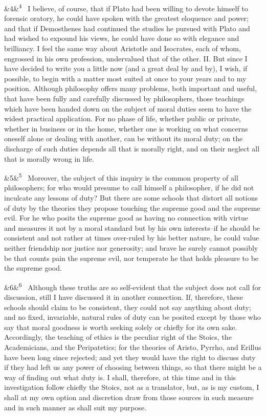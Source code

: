 \documentclass[12pt]{article}
\newcommand{\para}[1][]{\par\noindent\ifx&#1&\else\textsuperscript{\footnotesize #1}~\fi}
\begin{document}
\para[4] I believe, of course, that if Plato had been willing to devote himself to forensic oratory, he could have spoken with the greatest eloquence and power; and that if Demosthenes had continued the studies he pursued with Plato and had wished to expound his views, he could have done so with elegance and brilliancy. I feel the same way about Aristotle and Isocrates, each of whom, engrossed in his own profession, undervalued that of the other. II. But since I have decided to write you a little now (and a great deal by and by), I wish, if possible, to begin with a matter most suited at once to your years and to my position. Although philosophy offers many problems, both important and useful, that have been fully and carefully discussed by philosophers, those teachings which have been handed down on the subject of moral duties seem to have the widest practical application. For no phase of life, whether public or private, whether in business or in the home, whether one is working on what concerns oneself alone or dealing with another, can be without its moral duty; on the discharge of such duties depends all that is morally right, and on their neglect all that is morally wrong in life.

\para[5] Moreover, the subject of this inquiry is the common property of all philosophers; for who would presume to call himself a philosopher, if he did not inculcate any lessons of duty? But there are some schools that distort all notions of duty by the theories they propose touching the supreme good and the supreme evil. For he who posits the supreme good as having no connection with virtue and measures it not by a moral standard but by his own interests--if he should be consistent and not rather at times over-ruled by his better nature, he could value neither friendship nor justice nor generosity; and brave he surely cannot possibly be that counts pain the supreme evil, nor temperate he that holds pleasure to be the supreme good.

\para[6] Although these truths are so self-evident that the subject does not call for discussion, still I have discussed it in another connection. If, therefore, these schools should claim to be consistent, they could not say anything about duty; and no fixed, invariable, natural rules of duty can be posited except by those who say that moral goodness is worth seeking solely or chiefly for its own sake. Accordingly, the teaching of ethics is the peculiar right of the Stoics, the Academicians, and the Peripatetics; for the theories of Aristo, Pyrrho, and Erillus have been long since rejected; and yet they would have the right to discuss duty if they had left us any power of choosing between things, so that there might be a way of finding out what duty is. I shall, therefore, at this time and in this investigation follow chiefly the Stoics, not as a translator, but, as is my custom, I shall at my own option and discretion draw from those sources in such measure and in such manner as shall suit my purpose.
\end{document}
